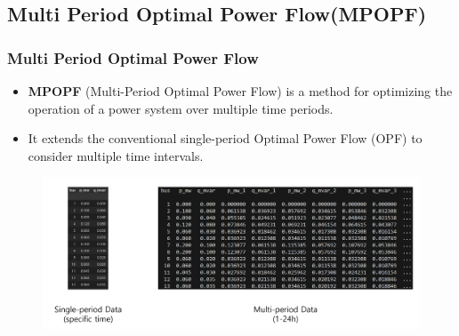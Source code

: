 \documentclass[
	11pt, %
	aspectratio=169, %
]{beamer}
\begin{document}
\subsection{Multi Period Optimal Power Flow(MPOPF)}

\begin{frame}
	\frametitle{Multi Period Optimal Power Flow}

	\begin{itemize}
		\item \textbf{MPOPF} (Multi-Period Optimal Power Flow) is a method for optimizing the operation of a power system over multiple time periods.
		\item It extends the conventional single-period Optimal Power Flow (OPF) to consider multiple time intervals.
	\end{itemize}

	\begin{figure}
		\includegraphics[width=4 in,keepaspectratio]{MPOPFtime.png}
	\end{figure}
	
\end{frame}


	

\end{document}
